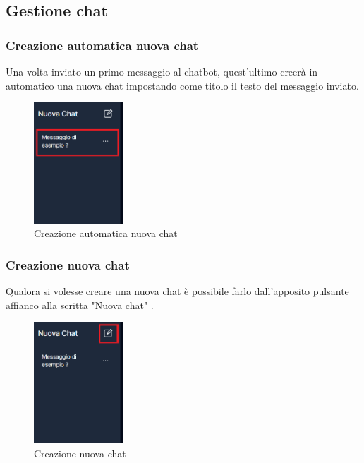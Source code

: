 \newpage
\subsection{Gestione chat}
\subsubsection{Creazione automatica nuova chat}
Una volta inviato un primo messaggio al chatbot, quest'ultimo creerà in automatico una nuova chat impostando come titolo il testo del messaggio inviato.
\begin{figure}[h!]
    \centering
    \includegraphics[width=0.3\textwidth]{automaticcreationchat.png}
    \caption{Creazione automatica nuova chat}\label{fig:automaticcreationchat}
\end{figure}

\subsubsection{Creazione nuova chat}
Qualora si volesse creare una nuova chat è possibile farlo dall'apposito pulsante affianco alla scritta "Nuova chat" .
\begin{figure}[h!]
    \centering
    \includegraphics[width=0.3\textwidth]{createnewchat.png}
    \caption{Creazione nuova chat}\label{fig:createnewchat}
\end{figure}
